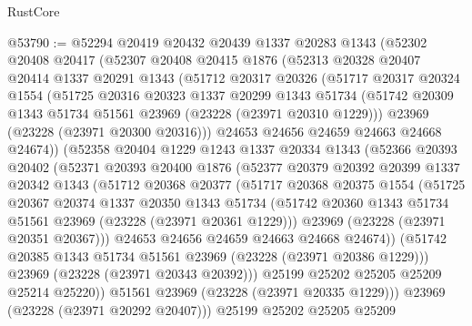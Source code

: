 \begin{lexlean}{RustCore}
\begin{coremodule}
@53790 := @52294
    @20419
    @20432
    @20439
    @1337
    @20283
    @1343
    (@52302
      @20408
      @20417
      (@52307
        @20408
        @20415
        @1876
        (@52313
          @20328
          @20407
          @20414
          @1337
          @20291
          @1343
          (@51712
            @20317
            @20326
            (@51717
              @20317
              @20324
              @1554
              (@51725
                @20316
                @20323
                @1337
                @20299
                @1343
                @51734
                (@51742 @20309 @1343 @51734 @51561 @23969 (@23228 (@23971 @20310 @1229)))
                @23969
                (@23228 (@23971 @20300 @20316)))
              @24653
              @24656
              @24659
              @24663
              @24668
              @24674))
          (@52358
            @20404
            @1229
            @1243
            @1337
            @20334
            @1343
            (@52366
              @20393
              @20402
              (@52371
                @20393
                @20400
                @1876
                (@52377
                  @20379
                  @20392
                  @20399
                  @1337
                  @20342
                  @1343
                  (@51712
                    @20368
                    @20377
                    (@51717
                      @20368
                      @20375
                      @1554
                      (@51725
                        @20367
                        @20374
                        @1337
                        @20350
                        @1343
                        @51734
                        (@51742 @20360 @1343 @51734 @51561 @23969 (@23228 (@23971 @20361 @1229)))
                        @23969
                        (@23228 (@23971 @20351 @20367)))
                      @24653
                      @24656
                      @24659
                      @24663
                      @24668
                      @24674))
                  (@51742 @20385 @1343 @51734 @51561 @23969 (@23228 (@23971 @20386 @1229)))
                  @23969
                  (@23228 (@23971 @20343 @20392)))
                @25199
                @25202
                @25205
                @25209
                @25214
                @25220))
            @51561
            @23969
            (@23228 (@23971 @20335 @1229)))
          @23969
          (@23228 (@23971 @20292 @20407)))
        @25199
        @25202
        @25205
        @25209

\end{coremodule}
\end{lexlean}
